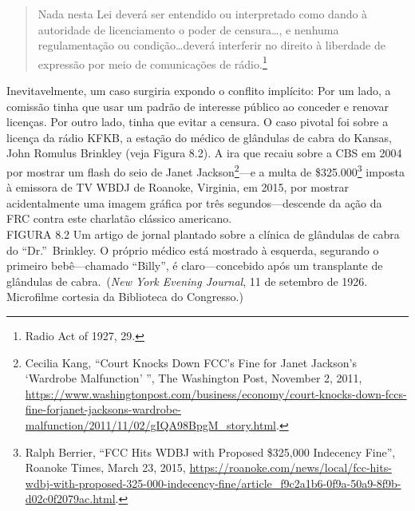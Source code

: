 \documentclass{book}
\newcommand{\ingles}[1]{\textit{#1}}
\begin{document}
\begin{quote}
    Nada nesta Lei deverá ser entendido ou interpretado como dando à autoridade
    de licenciamento o poder de censura\ldots, e nenhuma regulamentação ou
    condição\ldots deverá interferir no direito à liberdade de expressão por meio
    de comunicações de rádio.\footnote{Radio Act of 1927, 29.}  
\end{quote}

Inevitavelmente, um caso surgiria expondo o conflito implícito: Por um lado, a
comissão tinha que usar um padrão de interesse público ao conceder e renovar
licenças. Por outro lado, tinha que evitar a censura. O caso pivotal foi sobre a
licença da rádio KFKB, a estação do médico de glândulas de cabra do Kansas, John
Romulus Brinkley (veja Figura 8.2). A ira que recaiu sobre a CBS em 2004 por
mostrar um flash do seio de Janet Jackson\footnote{Cecilia Kang, ``Court Knocks
Down FCC's Fine for Janet Jackson's `Wardrobe Malfunction' '', The Washington Post,
November 2, 2011, \url{https://www.washingtonpost.com/business/economy/court-knocks-down-fccs-fine-forjanet-jacksons-wardrobe-malfunction/2011/11/02/gIQA98BpgM_story.html}.}---e
a multa de \$325.000\footnote{Ralph Berrier, ``FCC Hits WDBJ with Proposed \$325,000
Indecency Fine'', Roanoke Times, March 23, 2015, 
\url{https://roanoke.com/news/local/fcc-hits-wdbj-with-proposed-325-000-indecency-fine/article_f9c2a1b6-0f9a-50a9-8f9b-d02c0f2079ac.html}.}
imposta à emissora de TV WBDJ de Roanoke, Virginia, em 2015, por mostrar
acidentalmente uma imagem gráfica por três segundos---descende da ação da FRC
contra este charlatão clássico americano.\\

FIGURA 8.2 Um artigo de jornal plantado sobre a clínica de glândulas de cabra do
``Dr.''~Brinkley. O próprio médico está mostrado à esquerda, segurando o primeiro
bebê---chamado ``Billy'', é claro---concebido após um transplante de glândulas de
cabra.~(\ingles{New York Evening Journal}, 11 de setembro de 1926. Microfilme
cortesia da Biblioteca do Congresso.)\\
\end{document}
